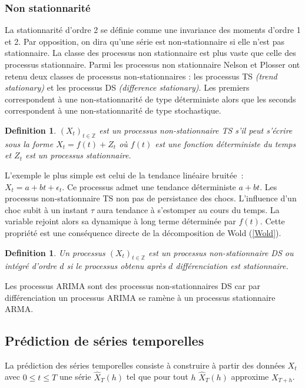 \documentclass[11pt]{scrartcl} %
\newtheorem{Def}[theorem]{Definition}
\newcommand{\Xt}{\left(X_t\right)_{t\in\mathbb{Z}}}
\begin{document}
\subsubsection{Non stationnarité}
La stationnarité d'ordre 2 se définie comme une invariance des moments d'ordre 1 et 2. Par opposition, on dira qu'une série est non-stationnaire si elle n'est pas stationnaire. La classe des processus non stationnaire est plus vaste que celle des processus stationnaire. Parmi les processus non stationnaire Nelson et Plosser \cite{NonSta} ont retenu deux classes de processus non-stationnaires : les processus TS \textit{(trend stationary)} et les processus DS \textit{(difference stationary)}. Les premiers correspondent à une non-stationnarité de type déterministe alors que les seconds correspondent à une non-stationnarité de type stochastique.
\begin{Def}
$\Xt$ est un processus non-stationnaire TS s'il peut s'écrire sous la forme $X_t = f(t)+Z_t$ où $f(t)$ est une fonction déterministe du temps et $Z_t$ est un processus stationnaire.
\end{Def}
L'exemple le plus simple est celui de la tendance linéaire bruitée~:~$X_t=a+bt+\epsilon_t$. Ce processus admet une tendance déterministe $a+bt$. Les processus non-stationnaire TS non pas de persistance des chocs. L'influence d'un choc subit à un instant $\tau$ aura tendance à s'estomper au cours du temps. La variable rejoint alors sa dynamique à long terme déterminée par $f(t)$. Cette propriété est une conséquence directe de la décomposition de Wold (\ref{Wold}).
\begin{Def}
Un processus $\Xt$ est un processus non-stationnaire DS ou intégré d'ordre $d$ si le processus obtenu après $d$ différenciation est stationnaire.
\end{Def}
Les processus ARIMA sont des processus non-stationnaires DS car par différenciation un processus ARIMA se ramène à un processus stationnaire ARMA.


\subsection{Prédiction de séries temporelles}
La prédiction des séries temporelles consiste à construire à partir des données $X_t$ avec $0\leq t\leq T$ une série $\hat{X}_T(h)$ tel que pour tout $h$  $\hat{X}_T(h)$ approxime $X_{T+h}$. 
\end{document}
